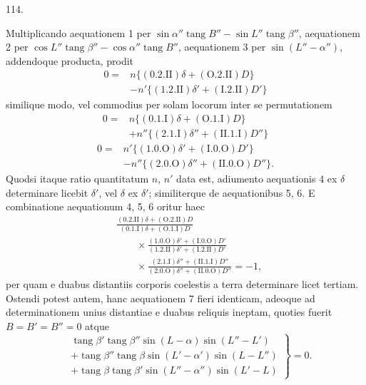 \par{}\medskip
\hypertarget{native-159-article114}{}
\begin{center}114.\end{center}
Multiplicando aequationem 1 per $\sin\alpha''\operatorname{tang}B''-\sin L''\operatorname{tang}\beta''$, aequationem 2 per $\cos L''\operatorname{tang}\beta''-\cos\alpha''\operatorname{tang}B''$, aequationem 3 per $\sin(L''-\alpha'')$, addendoque producta, prodit
\[
\begin{aligned}
0={}&n\{(0.2.\mathrm{II})\delta+(\mathrm{O}.2.\mathrm{II})D\}\\
&-n'\{(1.2.\mathrm{II})\delta'+(\mathrm{I}.2.\mathrm{II})D'\}
\end{aligned}\tag*{4)}
\]
similique modo, vel commodius per solam locorum inter se permutationem
\[
\begin{aligned}
0={}&n\{(0.1.\mathrm{I})\delta+(\mathrm{O}.1.\mathrm{I})D\}\\
&+n''\{(2.1.\mathrm{I})\delta''+(\mathrm{II}.1.\mathrm{I})D''\}
\end{aligned}\tag*{5)}
\]
\[
\begin{aligned}
0={}&n'\{(1.0.\mathrm{O})\delta'+(\mathrm{I}.0.\mathrm{O})D'\}\\
&-n''\{(2.0.\mathrm{O})\delta''+(\mathrm{II}.0.\mathrm{O})D''\}.
\end{aligned}\tag*{6)}
\]
Quodsi itaque ratio quantitatum $n$, $n'$ data est, adiumento aequationis 4 ex $\delta$ determinare licebit $\delta'$, vel $\delta$ ex $\delta'$; similiterque de aequationibus 5, 6. E combinatione aequationum 4, 5, 6 oritur haec
\[
\begin{aligned}
&\frac{(0.2.\mathrm{II})\delta+(\mathrm{O}.2.\mathrm{II})D}{(0.1.\mathrm{I})\delta+(\mathrm{O}.1.\mathrm{I})D}\\[.6em]
&\qquad\times\frac{(1.0.\mathrm{O})\delta'+(\mathrm{I}.0.\mathrm{O})D'}{(1.2.\mathrm{II})\delta'+(\mathrm{I}.2.\mathrm{II})D'}\\[.6em]
&\qquad\times\frac{(2.1.\mathrm{I})\delta''+(\mathrm{II}.1.\mathrm{I})D''}{(2.0.\mathrm{O})\delta''+(\mathrm{II}.0.\mathrm{O})D''}=-1,
\end{aligned}\tag*{7)}
\]
per quam e duabus distantiis corporis coelestis a terra determinare licet tertiam. Ostendi potest autem, hanc aequationem 7 fieri identicam, adeoque ad determinationem unius distantiae e duabus reliquis ineptam, quoties fuerit $B=B'=B''=0$ atque
\[
\left.\begin{aligned}
&\operatorname{tang}\beta'\operatorname{tang}\beta''\sin(L-\alpha)\sin(L''-L')\\
&+\operatorname{tang}\beta''\operatorname{tang}\beta\sin(L'-\alpha')\sin(L-L'')\\
&+\operatorname{tang}\beta\operatorname{tang}\beta'\sin(L''-\alpha'')\sin(L'-L)
\end{aligned}\right\}=0.
\]
